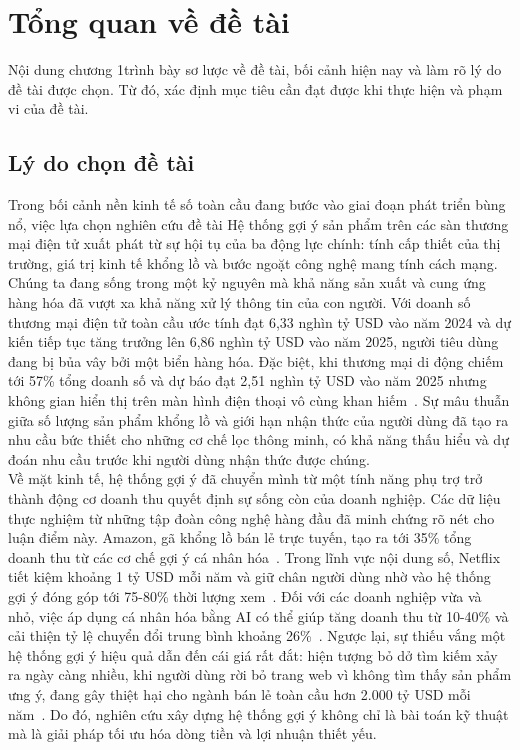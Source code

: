\chapter{Tổng quan về đề tài}
 Nội dung chương 1trình bày sơ lược về đề tài, bối cảnh hiện nay và làm rõ lý do đề tài được
 chọn. Từ đó, xác định mục tiêu cần đạt được khi thực hiện và phạm vi của đề tài.
\section{Lý do chọn đề tài}
Trong bối cảnh nền kinh tế số toàn cầu đang bước vào giai đoạn phát triển bùng nổ, việc lựa chọn nghiên cứu đề tài Hệ thống gợi ý sản phẩm trên các sàn thương mại điện tử xuất phát từ sự hội tụ của ba động lực chính: tính cấp thiết của thị trường, giá trị kinh tế khổng lồ và bước ngoặt công nghệ mang tính cách mạng. Chúng ta đang sống trong một kỷ nguyên mà khả năng sản xuất và cung ứng hàng hóa đã vượt xa khả năng xử lý thông tin của con người. Với doanh số thương mại điện tử toàn cầu ước tính đạt 6,33 nghìn tỷ USD vào năm 2024 và dự kiến tiếp tục tăng trưởng lên 6,86 nghìn tỷ USD vào năm 2025, người tiêu dùng đang bị bủa vây bởi một biển hàng hóa. Đặc biệt, khi thương mại di động chiếm tới 57\% tổng doanh số và dự báo đạt 2,51 nghìn tỷ USD vào năm 2025 nhưng không gian hiển thị trên màn hình điện thoại vô cùng khan hiếm~\cite{1}. Sự mâu thuẫn giữa số lượng sản phẩm khổng lồ và giới hạn nhận thức của người dùng đã tạo ra nhu cầu bức thiết cho những cơ chế lọc thông minh, có khả năng thấu hiểu và dự đoán nhu cầu trước khi người dùng nhận thức được chúng.\\

Về mặt kinh tế, hệ thống gợi ý đã chuyển mình từ một tính năng phụ trợ trở thành động cơ doanh thu quyết định sự sống còn của doanh nghiệp. Các dữ liệu thực nghiệm từ những tập đoàn công nghệ hàng đầu đã minh chứng rõ nét cho luận điểm này. Amazon, gã khổng lồ bán lẻ trực tuyến, tạo ra tới 35\% tổng doanh thu từ các cơ chế gợi ý cá nhân hóa~\cite{2}. Trong lĩnh vực nội dung số, Netflix tiết kiệm khoảng 1 tỷ USD mỗi năm và giữ chân người dùng nhờ vào hệ thống gợi ý đóng góp tới 75-80\% thời lượng xem~\cite{2}. Đối với các doanh nghiệp vừa và nhỏ, việc áp dụng cá nhân hóa bằng AI có thể giúp tăng doanh thu từ 10-40\% và cải thiện tỷ lệ chuyển đổi trung bình khoảng 26\%~\cite{3}. Ngược lại, sự thiếu vắng một hệ thống gợi ý hiệu quả dẫn đến cái giá rất đắt: hiện tượng bỏ dở tìm kiếm xảy ra ngày càng nhiều, khi người dùng rời bỏ trang web vì không tìm thấy sản phẩm ưng ý, đang gây thiệt hại cho ngành bán lẻ toàn cầu hơn 2.000 tỷ USD mỗi năm~\cite{4}. Do đó, nghiên cứu xây dựng hệ thống gợi ý không chỉ là bài toán kỹ thuật mà là giải pháp tối ưu hóa dòng tiền và lợi nhuận thiết yếu.\\

